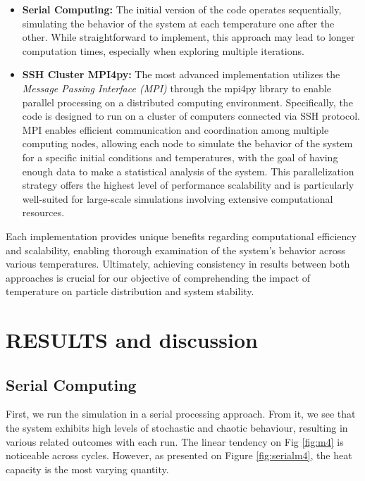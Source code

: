 \documentclass[%
 reprint,
 amsmath,amssymb,
 aps,
]{revtex4-2}
\begin{document}
\begin{itemize}
    \item {\textbf{Serial Computing:}} The initial version of the code operates sequentially, simulating the behavior of the system at each temperature one after the other. While straightforward to implement, this approach may lead to longer computation times, especially when exploring multiple iterations.
    \item {\textbf{SSH Cluster MPI4py:}} The most advanced implementation utilizes the \textit{Message Passing Interface (MPI)} through the mpi4py library to enable parallel processing on a distributed computing environment. Specifically, the code is designed to run on a cluster of computers connected via SSH protocol. MPI enables efficient communication and coordination among multiple computing nodes, allowing each node to simulate the behavior of the system for a specific initial conditions and temperatures, with the goal of having enough data to make a statistical analysis of the system. This parallelization strategy offers the highest level of performance scalability and is particularly well-suited for large-scale simulations involving extensive computational resources.
\end{itemize}

Each implementation provides unique benefits regarding computational efficiency and scalability, enabling thorough examination of the system's behavior across various temperatures. Ultimately, achieving consistency in results between both approaches is crucial for our objective of comprehending the impact of temperature on particle distribution and system stability.


\section{RESULTS and discussion}

\subsection{Serial Computing}

First, we run the simulation in a serial processing approach. From it, we see that the system exhibits high levels of stochastic and chaotic behaviour, resulting in various related outcomes with each run. The linear tendency on Fig \ref{fig:m4} is noticeable across cycles. However, as presented on Figure  \ref{fig:serialm4}, the heat capacity is the most varying quantity.
\end{document}
